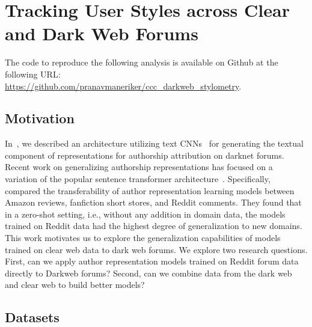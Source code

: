\section{Tracking User Styles across Clear and Dark Web Forums}
\label{chp:stylometry_extensions:followingTrail}
The code to reproduce the following analysis is available on Github at the following URL:\\
 {\url{https://github.com/pranavmaneriker/ccc_darkweb_stylometry}}.

\subsection{Motivation}
\label{chp:stylometry_extensions:followingTrail:motivation}
In~, we described an architecture utilizing text CNNs~\citep{kim2014convolutional} for generating the textual component of representations for authorship attribution on darknet forums.
Recent work on generalizing authorship representations has focused on a variation of the popular sentence transformer architecture~\citep{reimers2019sentencebert}.
Specifically, \citet{riverastao2021learning} compared the transferability of author representation learning models between Amazon reviews, fanfiction short stores, and Reddit comments.
They found that in a zero-shot setting, i.e., without any addition in domain data, the models trained on Reddit data had the highest degree of generalization to new domains.
This work motivates us to explore the generalization capabilities of models trained on clear web data to dark web forums.
We explore two research questions.
First, can we apply author representation models trained on Reddit forum data directly to Darkweb forums?
Second, can we combine data from the dark web and clear web to build better models?

\subsection{Datasets}
\label{chp:stylometry_extensions:followingTrail:datasets}

